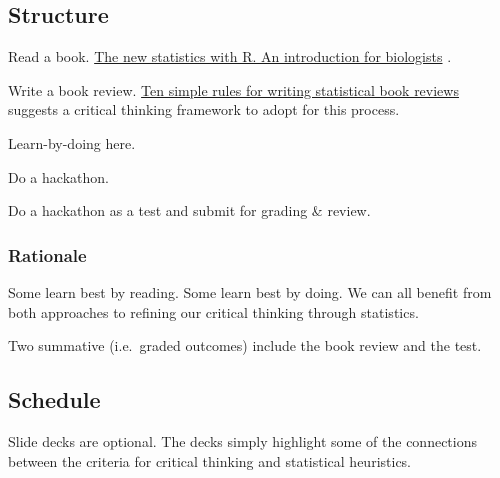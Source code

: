 \documentclass[
]{book}
\begin{document}
\hypertarget{structure}{%
\subsection*{Structure}\label{structure}}

Read a book. \href{https://oxford.universitypressscholarship.com/view/10.1093/acprof:oso/9780198729051.001.0001/acprof-9780198729051}{The new statistics with R. An introduction for biologists} \citep{RN6087}.

Write a book review. \href{https://journals.plos.org/ploscompbiol/article?id=10.1371/journal.pcbi.1006562}{Ten simple rules for writing statistical book reviews} \citep{RN6148} suggests a critical thinking framework to adopt for this process.

Learn-by-doing here.

Do a hackathon.

Do a hackathon as a test and submit for grading \& review.

\hypertarget{rationale}{%
\subsubsection*{Rationale}\label{rationale}}

Some learn best by reading. Some learn best by doing. We can all benefit from both approaches to refining our critical thinking through statistics.

Two summative (i.e.~graded outcomes) include the book review and the test.

\hypertarget{schedule}{%
\subsection*{Schedule}\label{schedule}}

Slide decks are optional. The decks simply highlight some of the connections between the criteria for critical thinking and statistical heuristics.
\end{document}
